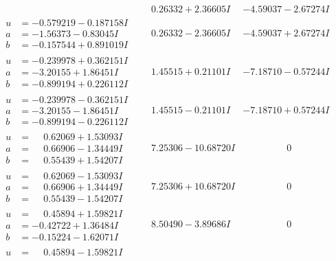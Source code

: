 \documentclass[1p]{elsarticle_modified}
\theoremstyle{definition}
\begin{document}
$$\begin{array}{c|c|c}
 & \phantom{-}0.26332 + 2.36605 I & -4.59037 - 2.67274 I \\ \hline\begin{aligned}
u &= -0.579219 - 0.187158 I \\
a &= -1.56373 - 0.83045 I \\
b &= -0.157544 + 0.891019 I\end{aligned}
 & \phantom{-}0.26332 - 2.36605 I & -4.59037 + 2.67274 I \\ \hline\begin{aligned}
u &= -0.239978 + 0.362151 I \\
a &= -3.20155 + 1.86451 I \\
b &= -0.899194 + 0.226112 I\end{aligned}
 & \phantom{-}1.45515 + 0.21101 I & -7.18710 - 0.57244 I \\ \hline\begin{aligned}
u &= -0.239978 - 0.362151 I \\
a &= -3.20155 - 1.86451 I \\
b &= -0.899194 - 0.226112 I\end{aligned}
 & \phantom{-}1.45515 - 0.21101 I & -7.18710 + 0.57244 I \\ \hline\begin{aligned}
u &= \phantom{-}0.62069 + 1.53093 I \\
a &= \phantom{-}0.66906 - 1.34449 I \\
b &= \phantom{-}0.55439 + 1.54207 I\end{aligned}
 & \phantom{-}7.25306 - 10.68720 I & \phantom{-0.000000 } 0 \\ \hline\begin{aligned}
u &= \phantom{-}0.62069 - 1.53093 I \\
a &= \phantom{-}0.66906 + 1.34449 I \\
b &= \phantom{-}0.55439 - 1.54207 I\end{aligned}
 & \phantom{-}7.25306 + 10.68720 I & \phantom{-0.000000 } 0 \\ \hline\begin{aligned}
u &= \phantom{-}0.45894 + 1.59821 I \\
a &= -0.42722 + 1.36484 I \\
b &= -0.15224 - 1.62071 I\end{aligned}
 & \phantom{-}8.50490 - 3.89686 I & \phantom{-0.000000 } 0 \\ \hline\begin{aligned}
u &= \phantom{-}0.45894 - 1.59821 I \\

\end{aligned}
\end{array}$$
\end{document}
